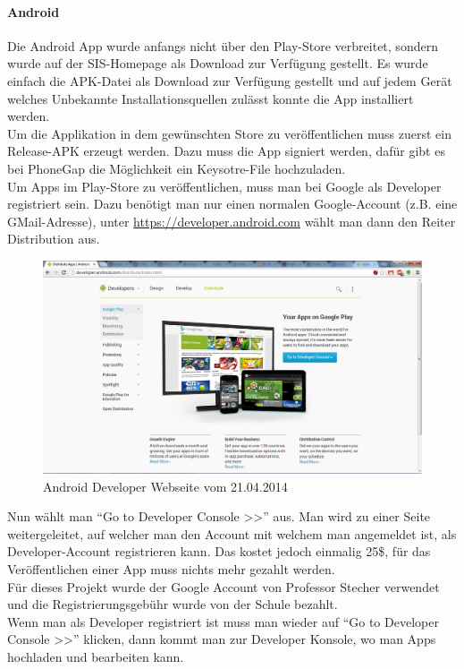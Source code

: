 \paragraph{Android\\}
Die Android App wurde anfangs nicht über den Play-Store verbreitet, sondern wurde auf der SIS-Homepage als Download zur Verfügung gestellt. Es wurde einfach die APK-Datei als Download zur Verfügung gestellt und auf jedem Gerät welches Unbekannte Installationsquellen zulässt konnte die App installiert werden.\\
Um die Applikation in dem gewünschten Store zu veröffentlichen muss zuerst ein Release-APK erzeugt werden. Dazu muss die App signiert werden, dafür gibt es bei PhoneGap die Möglichkeit ein Keysotre-File hochzuladen. \\
Um Apps im Play-Store zu veröffentlichen, muss man bei Google als Developer registriert sein. Dazu benötigt man nur einen normalen Google-Account (z.B. eine GMail-Adresse), unter \href{https://developer.android.com}{https://developer.android.com} wählt man dann den Reiter Distribution aus.\\

\begin{figure}[H]
\centering
\includegraphics[keepaspectratio=true, width=14cm]{images/appstores/AndroidDeveloper1.png}
\caption{Android Developer Webseite vom 21.04.2014}
\end{figure}

Nun wählt man \enquote{Go to Developer Console >>} aus. Man wird zu einer Seite weitergeleitet, auf welcher man den Account mit welchem man angemeldet ist, als Developer-Account registrieren kann. Das kostet jedoch einmalig 25\$, für das Veröffentlichen einer App muss nichts mehr gezahlt werden.\\
Für dieses Projekt wurde der Google Account von Professor Stecher verwendet und die Registrierungsgebühr wurde von der Schule bezahlt.\\
Wenn man als Developer registriert ist muss man wieder auf \enquote{Go to Developer Console >>} klicken, dann kommt man zur Developer Konsole, wo man Apps hochladen und bearbeiten kann.\\

